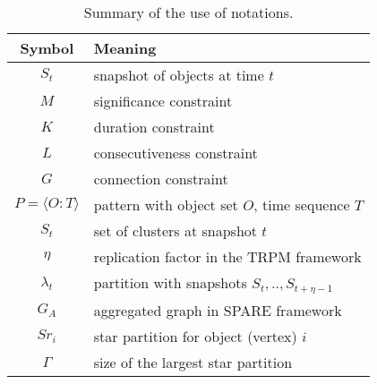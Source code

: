 \begin{table}[h]\scriptsize
\centering
\begin{tabular}{|c|l|} 
\hline
\textbf{Symbol} & \textbf{Meaning} \\
\hline
$S_t$ & snapshot of objects at time $t$ \\
\hline
$M$ & significance constraint \\
\hline 
$K$ & duration constraint\\
\hline
$L$ & consecutiveness constraint\\
\hline
$G$ & connection constraint \\
\hline
$P=\langle O:T \rangle$ & pattern with object set $O$, time sequence $T$\\
\hline
$S_t$ & set of clusters at snapshot $t$\\
\hline
$\eta$ & replication factor in the TRPM framework\\
\hline 
$\lambda_t$ & partition with snapshots $S_t,..,S_{t+\eta-1}$ \\
\hline
$G_A$ & aggregated graph in SPARE framework\\
\hline
$Sr_i $ &  star partition for object (vertex) $i$ \\
\hline 
$\Gamma$ & size of the largest star partition\\
\hline
\end{tabular} 
\caption{Summary of the use of notations.}
\end{table}
